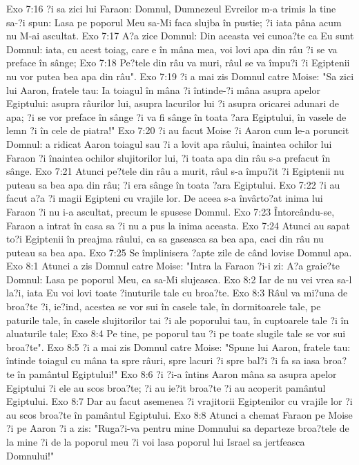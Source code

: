 Exo 7:16  ?i sa zici lui Faraon: Domnul, Dumnezeul Evreilor m-a trimis la tine sa-?i spun: Lasa pe poporul Meu sa-Mi faca slujba în pustie; ?i iata pâna acum nu M-ai ascultat.
Exo 7:17  A?a zice Domnul: Din aceasta vei cunoa?te ca Eu sunt Domnul: iata, cu acest toiag, care e în mâna mea, voi lovi apa din râu ?i se va preface în sânge;
Exo 7:18  Pe?tele din râu va muri, râul se va împu?i ?i Egiptenii nu vor putea bea apa din râu".
Exo 7:19  ?i a mai zis Domnul catre Moise: "Sa zici lui Aaron, fratele tau: Ia toiagul în mâna ?i întinde-?i mâna asupra apelor Egiptului: asupra râurilor lui, asupra lacurilor lui ?i asupra oricarei adunari de apa; ?i se vor preface în sânge ?i va fi sânge în toata ?ara Egiptului, în vasele de lemn ?i în cele de piatra!"
Exo 7:20  ?i au facut Moise ?i Aaron cum le-a poruncit Domnul: a ridicat Aaron toiagul sau ?i a lovit apa râului, înaintea ochilor lui Faraon ?i înaintea ochilor slujitorilor lui, ?i toata apa din râu s-a prefacut în sânge.
Exo 7:21  Atunci pe?tele din râu a murit, râul s-a împu?it ?i Egiptenii nu puteau sa bea apa din râu; ?i era sânge în toata ?ara Egiptului.
Exo 7:22  ?i au facut a?a ?i magii Egipteni cu vrajile lor. De aceea s-a învârto?at inima lui Faraon ?i nu i-a ascultat, precum le spusese Domnul.
Exo 7:23  Întorcându-se, Faraon a intrat în casa sa ?i nu a pus la inima aceasta.
Exo 7:24  Atunci au sapat to?i Egiptenii în preajma râului, ca sa gaseasca sa bea apa, caci din râu nu puteau sa bea apa.
Exo 7:25  Se împlinisera ?apte zile de când lovise Domnul apa.
Exo 8:1  Atunci a zis Domnul catre Moise: "Intra la Faraon ?i-i zi: A?a graie?te Domnul: Lasa pe poporul Meu, ca sa-Mi slujeasca.
Exo 8:2  Iar de nu vei vrea sa-l la?i, iata Eu voi lovi toate ?inuturile tale cu broa?te.
Exo 8:3  Râul va mi?una de broa?te ?i, ie?ind, acestea se vor sui în casele tale, în dormitoarele tale, pe paturile tale, în casele slujitorilor tai ?i ale poporului tau, în cuptoarele tale ?i în aluaturile tale;
Exo 8:4  Pe tine, pe poporul tau ?i pe toate slugile tale se vor sui broa?te".
Exo 8:5  ?i a mai zis Domnul catre Moise: "Spune lui Aaron, fratele tau: întinde toiagul cu mâna ta spre râuri, spre lacuri ?i spre bal?i ?i fa sa iasa broa?te în pamântul Egiptului!"
Exo 8:6  ?i ?i-a întins Aaron mâna sa asupra apelor Egiptului ?i ele au scos broa?te; ?i au ie?it broa?te ?i au acoperit pamântul Egiptului.
Exo 8:7  Dar au facut asemenea ?i vrajitorii Egiptenilor cu vrajile lor ?i au scos broa?te în pamântul Egiptului.
Exo 8:8  Atunci a chemat Faraon pe Moise ?i pe Aaron ?i a zis: "Ruga?i-va pentru mine Domnului sa departeze broa?tele de la mine ?i de la poporul meu ?i voi lasa poporul lui Israel sa jertfeasca Domnului!"
